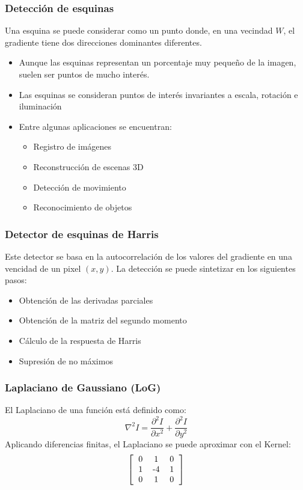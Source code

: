 \begin{frame}\frametitle{Detección de esquinas}
  Una esquina se puede considerar como un punto donde, en una vecindad $W$, el gradiente tiene dos direcciones dominantes diferentes.
  \begin{itemize}
  \item Aunque las esquinas representan un porcentaje muy pequeño de la imagen, suelen ser puntos de mucho interés.
  \item Las esquinas se consideran puntos de interés invariantes a escala, rotación e iluminación
  \item Entre algunas aplicaciones se encuentran:
    \begin{itemize}
    \item Registro de imágenes
    \item Reconstrucción de escenas 3D
    \item Detección de movimiento
    \item Reconocimiento de objetos
    \end{itemize}
  \end{itemize}
\end{frame}

\begin{frame}\frametitle{Detector de esquinas de Harris}
  Este detector se basa en la autocorrelación de los valores del gradiente en una vencidad de un pixel $(x,y)$. La detección se puede sintetizar en los siguientes pasos:
  \begin{itemize}
  \item Obtención de las derivadas parciales
  \item Obtención de la matriz del segundo momento
  \item Cálculo de la respuesta de Harris
  \item Supresión de no máximos
  \end{itemize}
\end{frame}

\begin{frame}\frametitle{Laplaciano de Gaussiano (LoG)}
  El Laplaciano de una función está definido como:
  \[\nabla^2 I = \frac{\partial^2 I}{\partial x^2} + \frac{\partial^2 I}{\partial y^2}\]
  Aplicando diferencias finitas, el Laplaciano se puede aproximar con el Kernel:
  \[\left[\begin{tabular}{ccc}0 & 1 & 0\\1 & -4 & 1\\0 & 1 & 0\end{tabular}\right]\]
\end{frame}
